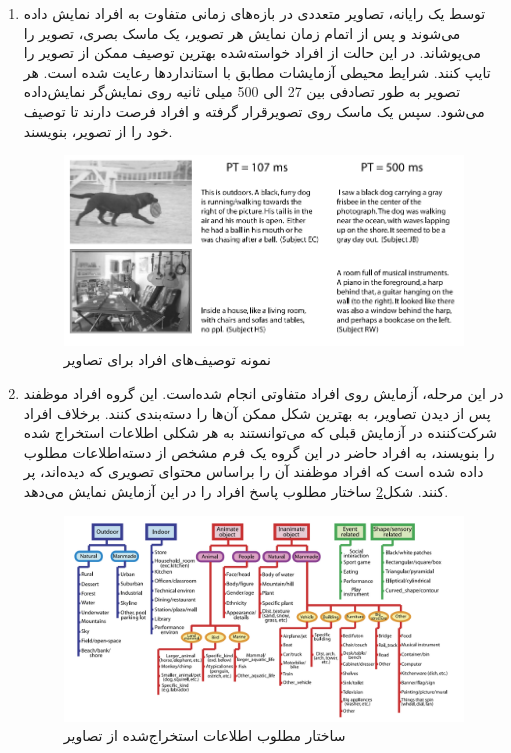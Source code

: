 \begin{enumerate}
\item توسط یک رایانه، تصاویر متعددی در بازه‌های زمانی متفاوت به افراد نمایش داده می‌شوند و پس از اتمام زمان نمایش هر تصویر، یک ماسک بصری، تصویر را می‌پوشاند. در این حالت از افراد خواسته‌شده بهترین توصیف ممکن از تصویر را تایپ کنند. شرایط محیطی آزمایشات مطابق با استانداردها رعایت شده است. هر تصویر به طور تصادفی بین 27 الی 500 میلی ثانیه روی نمایش‌گر نمایش‌داده می‌شود. سپس یک ماسک روی تصویرقرار گرفته و افراد فرصت دارند تا توصیف خود را از تصویر، بنویسند.


\begin{figure}[H]
\center
\includegraphics[scale=0.5]{./Imgs/fei2007we_res2.png}
\caption[نمونه توصیف‌های افراد برای تصاویر]{نمونه‌ توصیف‌های افراد برای تصاویر\cite{fei2007we}}
\label{fig:f2007we1}
\end{figure}



\item در این مرحله، آزمایش روی افراد متفاوتی انجام شده‌است. این گروه افراد موظفند پس از دیدن تصاویر، به بهترین شکل ممکن آن‌ها را دسته‌بندی کنند. برخلاف افراد شرکت‌کننده در آزمایش قبلی  که می‌توانستند به هر شکلی اطلاعات استخراج شده را بنویسند، به افراد حاضر در این گروه یک فرم مشخص از دسته‌اطلاعات مطلوب داده شده است که افراد موظفند آن را براساس محتوای تصویری که دیده‌اند، پر کنند. شکل\ref{fig:f2007we2}
ساختار مطلوب پاسخ افراد را در این آزمایش نمایش می‌دهد.

\begin{figure}[H]
\center
\includegraphics[scale=0.4]{./Imgs/fei2007we_exp1.png}
\caption{ساختار مطلوب اطلاعات استخراج‌شده از تصاویر\cite{fei2007we}}
\label{fig:f2007we2}
\end{figure}


\end{enumerate}
